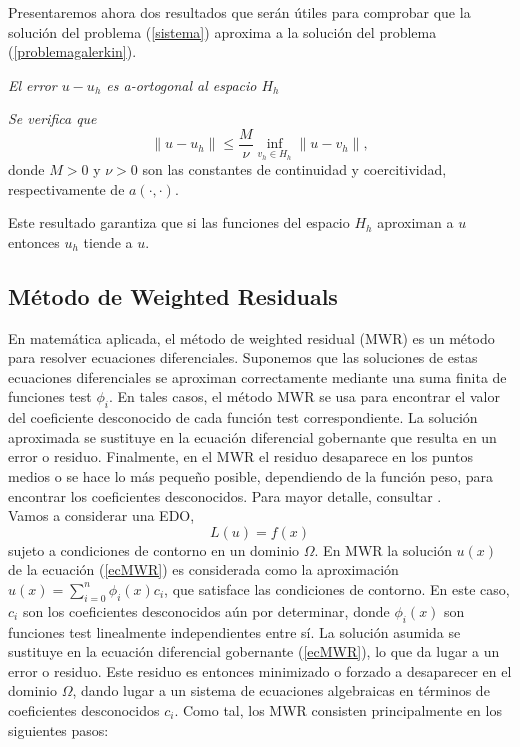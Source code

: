 Presentaremos ahora dos resultados que serán útiles para comprobar que la solución del problema (\ref{sistema}) aproxima a la solución del problema (\ref{problemagalerkin}).

\begin{lema1}
      \textit{El error $u-u_{h}$ es a-ortogonal al espacio $H_{h}$}
\end{lema1}

\begin{lema1}
      \textit{Se verifica que}
      \begin{equation}
          \|u-u_{h}\|\leq\frac{M}{\nu}\inf_{v_{h}\in H_{h}}\|u-v_{h}\|,
      \end{equation}
donde $M>0$ y $\nu>0$ son las constantes de continuidad y coercitividad, respectivamente de $a(\cdot,\cdot)$.
\end{lema1}

Este resultado garantiza que si las funciones del espacio $H_{h}$ aproximan a $u$ entonces $u_{h}$ tiende a $u$.

\subsection{Método de Weighted Residuals}

    En matemática aplicada, el método de weighted residual (MWR) es un método para resolver ecuaciones diferenciales. Suponemos que las soluciones de estas ecuaciones diferenciales se aproximan correctamente mediante una suma finita de funciones test $\phi_{i}$. En tales casos, el método MWR se usa para encontrar el valor del coeficiente desconocido de cada función test correspondiente. La solución aproximada se sustituye en la ecuación diferencial gobernante que resulta en un error o residuo. Finalmente, en el MWR el residuo desaparece en los puntos medios o se hace lo más pequeño posible, dependiendo de la función peso, para encontrar los coeficientes desconocidos. Para mayor detalle, consultar \cite{MWR}.\\
    
    Vamos a considerar una EDO,
    \begin{equation}
    \label{ecMWR}
         L(u)=f(x)
    \end{equation}
    sujeto a condiciones de contorno en un dominio $\Omega$. En MWR la solución $u(x)$ de la ecuación (\ref{ecMWR}) es considerada como la aproximación $\hat{u}(x)=\displaystyle\sum_{i=0}^{n}\phi_{i}(x)c_{i}$, que satisface las condiciones de contorno. En este caso, $c_{i}$ son los coeficientes desconocidos aún por determinar, donde $\phi_{i}(x)$ son funciones test linealmente independientes entre sí. La solución asumida se sustituye en la ecuación diferencial gobernante (\ref{ecMWR}), lo que da lugar a un error o residuo. Este residuo es entonces minimizado o forzado a desaparecer en el dominio $\Omega$, dando lugar a un sistema de ecuaciones algebraicas en términos de coeficientes desconocidos $c_{i}$. Como tal, los MWR consisten principalmente en los siguientes pasos:
    
